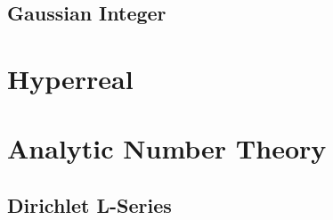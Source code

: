 \subsection{Gaussian Integer}\label{sec:gaussian_integer}



\section{Hyperreal}\label{sec:hyperreal}



\section{Analytic Number Theory}\label{sec:analytic_number_theory}
\subsection{Dirichlet L-Series}\label{sec:l_series}
